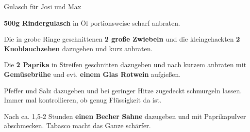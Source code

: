 \begin{recipe}[]{Gulasch für Josi und Max} %
	
\step
\textbf{500g Rindergulasch} in Öl portionsweise scharf anbraten.

\step
Die in grobe Ringe geschnittenen \textbf{2 große Zwiebeln} und die kleingehackten \textbf{2 Knoblauchzehen} dazugeben und kurz anbraten.

\step
Die \textbf{2 Paprika} in Streifen geschnitten dazugeben und nach kurzem anbraten mit \textbf{Gemüsebrühe} und evt. \textbf{einem Glas Rotwein} aufgießen.

\step
Pfeffer und Salz dazugeben und bei geringer Hitze zugedeckt schmurgeln lassen. Immer mal kontrollieren, ob genug Flüssigkeit da ist.

\step
Nach ca. 1,5-2 Stunden \textbf{einen Becher Sahne} dazugeben und mit Paprikapulver abschmecken. Tabasco macht das Ganze schärfer.


\end{recipe}